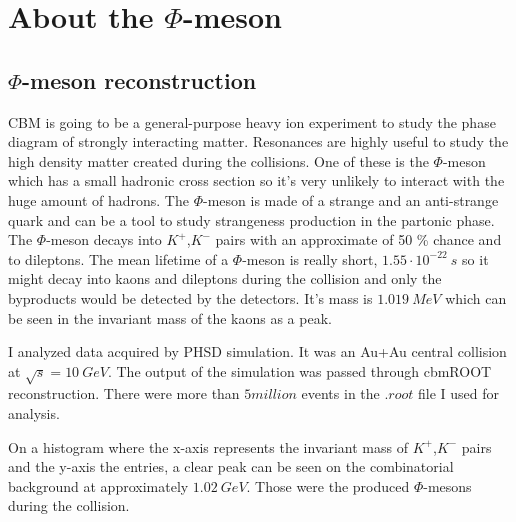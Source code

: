 \documentclass[a4paper,12pt]{article}
\begin{document}
\section{ About the $\Phi$-meson}
\subsection{ $\Phi$-meson reconstruction}
\vspace{5mm}
\par CBM is going to be a general-purpose heavy ion experiment to study the phase diagram of strongly interacting matter. Resonances
 are highly useful to study the high density matter created during the collisions. One of these is the $\Phi$-meson which has a small
  hadronic cross section so  it's  very unlikely to interact with the huge amount of hadrons. The $\Phi$-meson is made of a strange
   and an anti-strange quark and can be a tool to study strangeness production in the partonic phase. The $\Phi$-meson decays into
	$K^{+}$,$K^{-}$ pairs with an approximate of 50 \% chance and to dileptons. The mean lifetime of a $\Phi$-meson is really short,
	 $1.55\cdot10^{-22}~s$ so it might decay into kaons and dileptons during the collision and only the byproducts would be detected 
	 by the detectors. It's mass is $1.019~MeV$ which can be seen in the invariant mass of the kaons as a peak.
\vspace{5mm}
\par I analyzed data acquired by PHSD simulation. It was an Au+Au central collision at $\sqrt{s} = 10~GeV$. The output of the simulation
 was passed through cbmROOT reconstruction. There were more than $5 million$ events in the $.root$ file I used for analysis.
\vspace{5mm}
\par On a histogram where the x-axis represents the invariant mass of $K^{+}$,$K^{-}$ pairs and the y-axis the entries, a clear peak 
can be seen on the combinatorial background at approximately $1.02~GeV$. Those were the produced $\Phi$-mesons during the collision.
\end{document}
